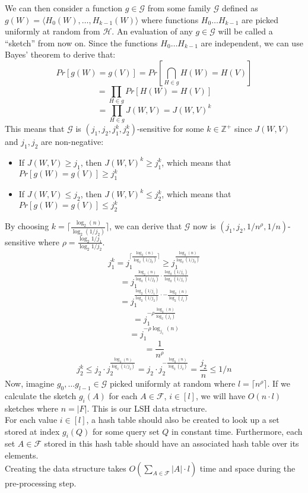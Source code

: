 We can then consider a function $g \in \mathcal{G}$ from some family $\mathcal{G}$ defined as $g(W) = \langle H_0(W), \dots, H_{k-1}(W) \rangle$ where functions $H_0 \dots H_{k-1}$ are picked uniformly at random from $\mathcal{H}$. An evaluation of any $g\in \mathcal{G}$ will be called a ``sketch'' from now on. Since the functions $H_0 \dots H_{k-1}$ are independent, we can use Bayes' theorem to derive that:
$$Pr[g(W)=g(V)] = Pr[\bigcap_{H \in g}H(W) = H(V)]$$
$$=\prod_{H\in g}Pr[H(W) = H(V)]$$
$$=\prod_{H\in g}J(W,V)=J(W,V)^k$$
This means that $\mathcal{G}$ is $(j_1, j_2, j_1^k, j_2^k)$-sensitive for some $k\in \mathbb{Z}^+$ since $J(W,V)$ and $j_1, j_2$ are non-negative:
\begin{itemize}
    \item If $J(W,V) \geq j_1$, then $J(W,V)^k \geq j_1^k$, which means that $Pr[g(W)=g(V)] \geq j_1^k$
    \item If $J(W,V) \leq j_2$, then $J(W,V)^k \leq j_2^k$, which means that $Pr[g(W)=g(V)] \leq j_2^k$
\end{itemize}
By choosing $k=\lceil \frac{\log_2(n)}{\log_2(1/j_2)} \rceil$, we can derive that $\mathcal{G}$ now is $(j_1, j_2, 1/n^\rho, 1/n)$-sensitive where $\rho=\frac{\log_2{1/j_1}}{\log_2{1/j_2}}$.
$$j_1^k = j_1^{\lceil\frac{\log_2(n)}{\log_2(1/j_2)} \rceil}\geq j_1^{\frac{\log_2(n)}{\log_2(1/j_2)}}$$
$$=j_1^{\frac{\log_2{(n)}}{\log_2{(1/j_2)}}\cdot\frac{\log_2{(1/j_1)}}{\log_2{(1/j_1)}}}$$
$$=j_1^{\frac{\log_2{(1/j_1)}}{\log_2{(1/j_2)}}\cdot-\frac{\log_2{(n)}}{\log_2{(j_1)}}}$$
$$=j_1^{-\rho\frac{\log_2{(n)}}{\log_2{(j_1)}}}$$
$$=j_1^{-\rho\log_{j_1}{(n)}}$$
$$=\frac{1}{n^\rho}$$
$$j_2^k\leq j_2 \cdot j_2^{\frac{\log_2(n)}{\log_2(1/j_2)}}=j_2\cdot j_2^{-\frac{\log_2{(n)}}{\log_2{(j_2)}}}=\frac{j_2}{n}\leq 1/n$$
Now, imagine $g_0, \dots g_{l-1} \in \mathcal{G}$ picked uniformly at random where $l=\lceil n^\rho \rceil$. If we calculate the sketch $g_i(A)$ for each $A\in \mathcal{F}$, $i\in [l]$, we will have $O(n\cdot l)$ sketches where $n=|F|$. This is our LSH data structure. \\
For each value $i\in [l]$, a hash table should also be created to look up a set stored at index $g_i(Q)$ for some query set $Q$ in constant time.
Furthermore, each set $A\in \mathcal{F}$ stored in this hash table should have an associated hash table over its elements.\\
Creating the data structure takes $O(\sum_{A\in \mathcal{F}}|A| \cdot l)$ time and space during the pre-processing step.\\
